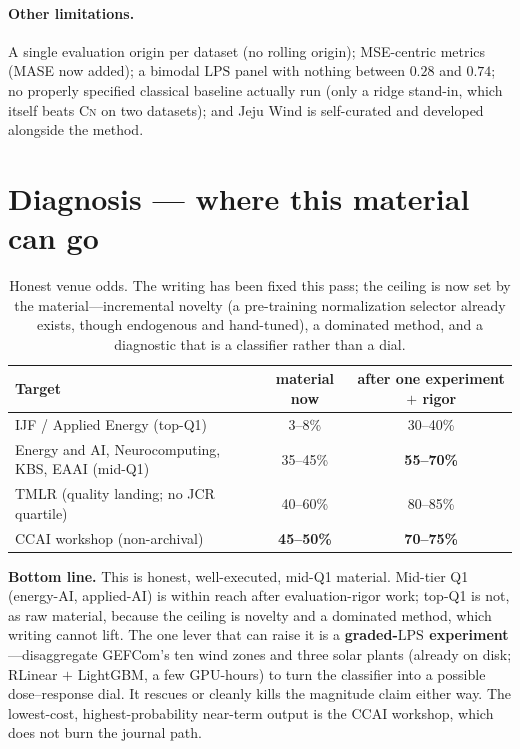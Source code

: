 \documentclass{article}
\newcommand{\lps}{\ensuremath{\mathrm{LPS}}}
\newcommand{\cnm}{\textsc{Cn}}
\begin{document}
\paragraph{Other limitations.}
A single evaluation origin per dataset (no rolling origin); MSE-centric metrics
(MASE now added); a bimodal \lps{} panel with nothing between $0.28$ and $0.74$;
no properly specified classical baseline actually run (only a ridge stand-in,
which itself beats \cnm{} on two datasets); and Jeju Wind is self-curated and
developed alongside the method.

\section{Diagnosis --- where this material can go}

\begin{table}[h]
\centering\small
\caption{Honest venue odds. The writing has been fixed this pass; the ceiling is
now set by the material---incremental novelty (a pre-training normalization
selector already exists, though endogenous and hand-tuned), a dominated method,
and a diagnostic that is a classifier rather than a dial.}
\begin{tabular}{lcc}
\toprule
Target & material now & after one experiment $+$ rigor \\
\midrule
IJF / Applied Energy (top-Q1) & 3--8\% & 30--40\% \\
Energy and AI, Neurocomputing, KBS, EAAI (mid-Q1) & 35--45\% & \textbf{55--70\%} \\
TMLR (quality landing; no JCR quartile) & 40--60\% & 80--85\% \\
CCAI workshop (non-archival) & \textbf{45--50\%} & \textbf{70--75\%} \\
\bottomrule
\end{tabular}
\end{table}

\noindent \textbf{Bottom line.} This is honest, well-executed, mid-Q1 material.
Mid-tier Q1 (energy-AI, applied-AI) is within reach after evaluation-rigor work;
top-Q1 is not, as raw material, because the ceiling is novelty and a dominated
method, which writing cannot lift. The one lever that can raise it is a
\textbf{graded-\lps{} experiment}---disaggregate GEFCom's ten wind zones and
three solar plants (already on disk; RLinear $+$ LightGBM, a few GPU-hours) to
turn the classifier into a possible dose--response dial. It rescues or cleanly
kills the magnitude claim either way. The lowest-cost, highest-probability
near-term output is the CCAI workshop, which does not burn the journal path.
\end{document}
